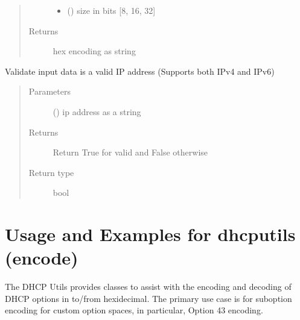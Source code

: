\documentclass[letterpaper,10pt,english]{sphinxmanual}
\begin{document}
\begin{fulllineitems}
\begin{fulllineitems}
\begin{quote}
\begin{description}
\begin{itemize}
\item {} 
\sphinxAtStartPar
{} () \textendash{} size in bits {[}8, 16, 32{]}

\end{itemize}

\item[{Returns}] \leavevmode
\sphinxAtStartPar
hex encoding as string

\end{description}\end{quote}

\end{fulllineitems}


\begin{fulllineitems}
\label{\detokenize{dhcp_encode-class:bloxone.dhcp_encode.validate_ip}}
\sphinxAtStartPar
Validate input data is a valid IP address
(Supports both IPv4 and IPv6)
\begin{quote}\begin{description}
\item[{Parameters}] \leavevmode
\sphinxAtStartPar
{} () \textendash{} ip address as a string

\item[{Returns}] \leavevmode
\sphinxAtStartPar
Return True for valid and False otherwise

\item[{Return type}] \leavevmode
\sphinxAtStartPar
bool

\end{description}\end{quote}

\end{fulllineitems}


\end{fulllineitems}



\section{Usage and Examples for dhcputils (encode)}
\label{\detokenize{dhcp_encode-usage:usage-and-examples-for-dhcputils-encode}}\label{\detokenize{dhcp_encode-usage::doc}}
\sphinxAtStartPar
The DHCP Utils provides classes to assist with the encoding and decoding of
DHCP options in to/from hexidecimal. The primary use case is for sub\sphinxhyphen{}option
encoding for custom option spaces, in particular, Option 43 encoding.
\end{document}
